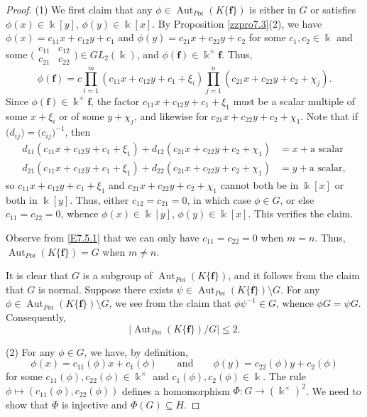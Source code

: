 \documentclass[10pt,a4paper]{amsart}
\DeclareMathOperator{\Aut}{Aut}
\newcommand \bff {{\mathbf{f}}}
\newcommand \kx {\Bbbk^\times}
\begin{document}
\begin{proof}
(1) We first claim that any $\phi \in \Aut_{Poi}(K\{\bff\})$ is either in $G$ or satisfies $\phi(x) \in \Bbbk[y]$, $\phi(y) \in \Bbbk[x]$.  By Proposition \ref{zzpro7.3}(2), we have $\phi(x) = c_{11}x+c_{12}y+c_1$ and $\phi(y) = c_{21}x+c_{22}y+c_2$ 
for some $c_1,c_2\in \Bbbk$ and some $\bigl( \begin{smallmatrix} c_{11}&c_{12}\\
c_{21}&c_{22}\end{smallmatrix} \bigr) \in GL_2(\Bbbk)$, and $\phi(\bff) \in \kx \bff$.  Thus,
\begin{equation}  \label{E7.5.1}  \tag{E7.5.1}
\phi(\bff) = c \prod_{i=1}^m (c_{11}x+c_{12}y+c_1 +\xi_i) \prod_{j=1}^n (c_{21}x+c_{22}y+c_2 + \chi_j).
\end{equation}
Since $\phi(\bff) \in \kx \bff$, the factor $c_{11}x+c_{12}y+c_1 +\xi_1$ must be a scalar multiple of some $x+\xi_i$ or of some $y+\chi_j$, and likewise for $c_{21}x+c_{22}y+c_2 + \chi_1$.  Note that if $\bigl( d_{ij} \bigr) = \bigl( c_{ij} \bigr)^{-1}$, then
\begin{align*}
d_{11}(c_{11}x+c_{12}y+c_1 +\xi_1) + d_{12}(c_{21}x+c_{22}y+c_2 + \chi_1) &= x + \text{a scalar}  \\
d_{21}(c_{11}x+c_{12}y+c_1 +\xi_1) + d_{22}(c_{21}x+c_{22}y+c_2 + \chi_1) &= y + \text{a scalar},
\end{align*}
so $c_{11}x+c_{12}y+c_1 +\xi_1$ and $c_{21}x+c_{22}y+c_2 + \chi_1$ cannot both be in $\Bbbk[x]$ or both in $\Bbbk[y]$.  Thus, either $c_{12} = c_{21} = 0$, in which case $\phi \in G$, or else $c_{11} = c_{22} = 0$, whence $\phi(x) \in \Bbbk[y]$, $\phi(y) \in \Bbbk[x]$.  This verifies the claim.

Observe from \eqref{E7.5.1} that we can only have $c_{11} = c_{22} = 0$ when $m=n$.  Thus, $\Aut_{Poi}(K\{\bff\}) = G$ when $m \ne n$.

It is clear that $G$ is a subgroup of $\Aut_{Poi}(K\{\bff\})$, and it follows from the claim that $G$ is normal.  Suppose there exists $\psi \in \Aut_{Poi}(K\{\bff\}) \setminus G$.  For any $\phi \in \Aut_{Poi}(K\{\bff\}) \setminus G$, we see from the claim that $\phi\psi^{-1} \in G$, whence $\phi G = \psi G$.  Consequently, 
$$
|{\Aut_{Poi}}(K\{\bff\}) / G | \le 2.
$$

(2) For any $\phi \in G$, we have, by definition,
$$
\phi(x) = c_{11}(\phi) x + c_1(\phi) \qquad \text{and} \qquad \phi(y) = c_{22}(\phi) y + c_2(\phi)
$$
for some $c_{11}(\phi), c_{22}(\phi) \in \kx$ and $c_1(\phi), c_2(\phi) \in \Bbbk$.  The rule $\phi \mapsto (c_{11}(\phi), c_{22}(\phi))$ defines a homomorphism $\Phi : G \rightarrow (\kx)^2$.  We need to show that $\Phi$ is injective and $\Phi(G) \subseteq H$.


\end{proof}
\end{document}
